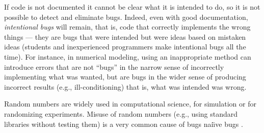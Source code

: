 \documentclass{comjnl}
\begin{document}
If code is not documented it cannot be clear what it is intended to do, so it is not possible to detect and eliminate bugs. Indeed, even with good documentation, \emph{intentional bugs\/} will remain, that is, code that correctly implements the wrong things \cite{essence-of-software,fixit} --- they are bugs that were intended but were ideas based on mistaken ideas (students and inexperienced programmers make intentional bugs all the time). For instance, in numerical modeling, using an inappropriate method can introduce errors that are not ``bugs'' in the narrow sense of incorrectly implementing what was wanted, but are bugs in the wider sense of producing incorrect results (e.g., ill-conditioning) that is, what was intended was wrong. 

Random numbers are widely used in computational science, for simulation or for randomizing experiments. Misuse of random numbers (e.g., using standard libraries without testing them) is a very common cause of bugs nai\"\i ve bugs \cite{knuth}.
\end{document}
